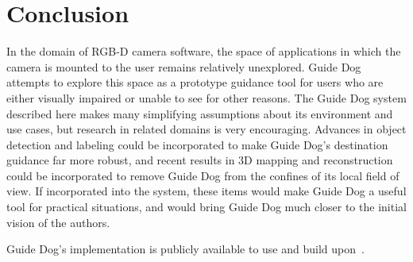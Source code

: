 \section{Conclusion}
\label{sec:conclusion}

In the domain of RGB-D camera software, the space of applications in which the
camera is mounted to the user remains relatively unexplored. Guide Dog attempts
to explore this space as a prototype guidance tool for users who are either
visually impaired or unable to see for other reasons. The Guide Dog system
described here makes many simplifying assumptions about its environment and
use cases, but research in related domains is very encouraging. Advances in
object detection and labeling could be incorporated to make Guide Dog's
destination guidance far more robust, and recent results in 3D mapping and
reconstruction could be incorporated to remove Guide Dog from the confines
of its local field of view. If incorporated into the system, these items
would make Guide Dog a useful tool for practical situations, and would bring
Guide Dog much closer to the initial vision of the authors. 

Guide Dog's implementation is publicly available to use and build
upon~\cite{guidedog-website}.
